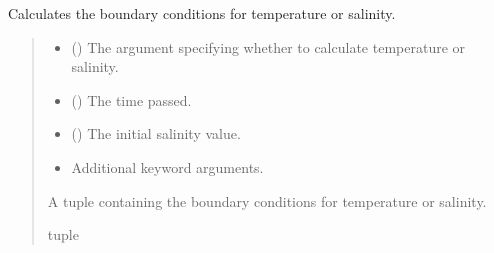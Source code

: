 \documentclass[a4paper,11pt,english,openany]{sphinxmanual}
\begin{document}

\begin{fulllineitems}
\label{\detokenize{api/spyice.preprocess.initial_boundary_conditions:src.spyice.preprocess.initial_boundary_conditions.boundary_condition}}
\pysigstartsignatures
\pysiglinewithargsret
{}
{\sphinxparamcomma {}\sphinxparamcomma {}\sphinxparamcomma {}}
{}
\pysigstopsignatures
\sphinxAtStartPar
Calculates the boundary conditions for temperature or salinity.
\begin{quote}\begin{description}
\begin{itemize}
\item {} 
\sphinxAtStartPar
{} () \textendash{} The argument specifying whether to calculate temperature or salinity.

\item {} 
\sphinxAtStartPar
{} () \textendash{} The time passed.

\item {} 
\sphinxAtStartPar
{} () \textendash{} The initial salinity value.

\item {} 
\sphinxAtStartPar
{} \textendash{} Additional keyword arguments.

\end{itemize}

\sphinxAtStartPar
A tuple containing the boundary conditions for temperature or salinity.

\sphinxAtStartPar
tuple

\sphinxAtStartPar
{} \textendash{} 

\end{description}\end{quote}

\end{fulllineitems}
\end{document}
